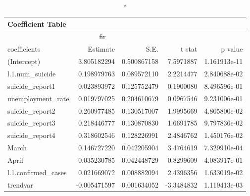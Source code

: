 \begin{longtable}{lrrrr}
\caption*{
{\large Coefficient Table}
} \\ 
\toprule
\multicolumn{4}{c}{fir} &  \\ 
\cmidrule(lr){1-4}
coefficients & Estimate & S.E. & t stat & p value \\ 
\midrule
(Intercept) & 3.805182294 & 0.500867158 & 7.5971887 & 1.161913e-11 \\ 
l.1.num\_suicide & 0.198979763 & 0.089572110 & 2.2214477 & 2.840688e-02 \\ 
suicide\_report1 & 0.023893972 & 0.125752479 & 0.1900080 & 8.496596e-01 \\ 
unemployment\_rate & 0.019797025 & 0.204610679 & 0.0967546 & 9.231006e-01 \\ 
suicide\_report2 & 0.260977485 & 0.130517007 & 1.9995669 & 4.805800e-02 \\ 
suicide\_report3 & 0.218446777 & 0.130870830 & 1.6691785 & 9.797836e-02 \\ 
suicide\_report4 & 0.318602546 & 0.128226991 & 2.4846762 & 1.450176e-02 \\ 
March & 0.146727220 & 0.042205904 & 3.4764619 & 7.329910e-04 \\ 
April & 0.035230785 & 0.042448729 & 0.8299609 & 4.083917e-01 \\ 
l.1.confirmed\_cases & 0.021669072 & 0.008882094 & 2.4396356 & 1.633019e-02 \\ 
trendvar & -0.005471597 & 0.001634052 & -3.3484832 & 1.119413e-03 \\ 
\bottomrule
\end{longtable}

